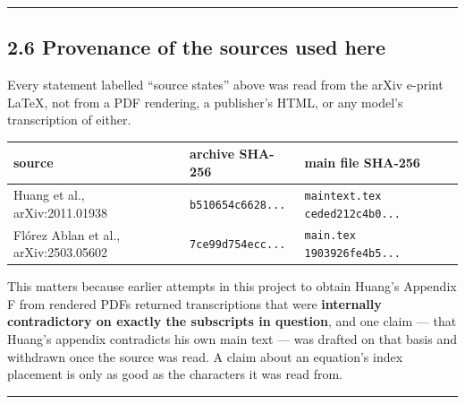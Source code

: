 \documentclass[
  10pt,
]{article}
\newcounter{none} %
\begin{document}
\begin{center}\rule{0.5\linewidth}{0.5pt}\end{center}

\subsection{2.6 Provenance of the sources used
here}\label{provenance-of-the-sources-used-here}

Every statement labelled ``source states'' above was read from the arXiv
e-print LaTeX, not from a PDF rendering, a publisher's HTML, or any
model's transcription of either.

{\def\LTcaptype{none} %
\begin{longtable}[]{@{}
  >{\raggedright\arraybackslash}p{}
  >{\raggedright\arraybackslash}p{}
  >{\raggedright\arraybackslash}p{}@{}}
\toprule\noalign{}
\begin{minipage}[b]{\linewidth}\raggedright
source
\end{minipage} & \begin{minipage}[b]{\linewidth}\raggedright
archive SHA-256
\end{minipage} & \begin{minipage}[b]{\linewidth}\raggedright
main file SHA-256
\end{minipage} \\
\midrule\noalign{}
\endhead
\bottomrule\noalign{}
\endlastfoot
Huang et al., arXiv:2011.01938 & \texttt{b510654c6628...} &
\texttt{maintext.tex} \texttt{ceded212c4b0...} \\
Flórez Ablan et al., arXiv:2503.05602 & \texttt{7ce99d754ecc...} &
\texttt{main.tex} \texttt{1903926fe4b5...} \\
\end{longtable}
}

This matters because earlier attempts in this project to obtain Huang's
Appendix F from rendered PDFs returned transcriptions that were
\textbf{internally contradictory on exactly the subscripts in question},
and one claim --- that Huang's appendix contradicts his own main text
--- was drafted on that basis and withdrawn once the source was read. A
claim about an equation's index placement is only as good as the
characters it was read from.

\begin{center}\rule{0.5\linewidth}{0.5pt}\end{center}
\end{document}
